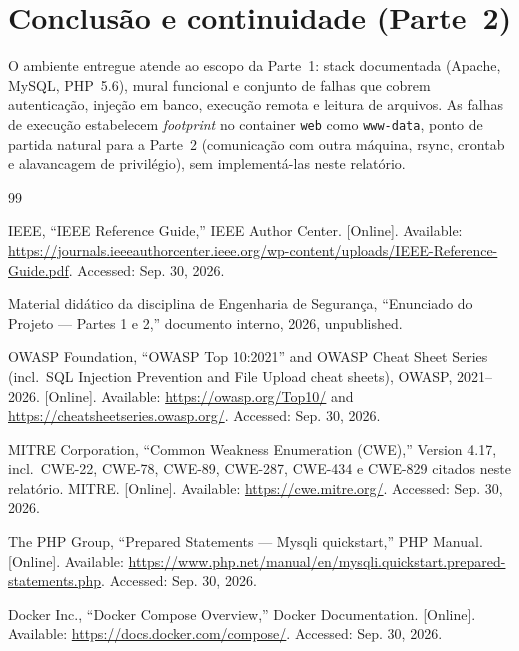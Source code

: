   \section{Conclusão e continuidade (Parte~2)}
  
  O ambiente entregue atende ao escopo da Parte~1: stack documentada (Apache, MySQL, PHP~5.6), mural
  funcional e conjunto de falhas que cobrem autenticação, injeção em banco, execução remota e leitura
  de arquivos. As falhas de execução estabelecem \emph{footprint} no container \texttt{web} como
  \texttt{www-data}, ponto de partida natural para a Parte~2 (comunicação com outra máquina, rsync,
  crontab e alavancagem de privilégio), sem implementá-las neste relatório.
  
  
  
  \begin{thebibliography}{99}
  
  IEEE, ``IEEE Reference Guide,'' IEEE Author Center. [Online]. Available:
  \url{https://journals.ieeeauthorcenter.ieee.org/wp-content/uploads/IEEE-Reference-Guide.pdf}.
  Accessed: Sep. 30, 2026.
  
  Material didático da disciplina de Engenharia de Segurança, ``Enunciado do Projeto --- Partes 1 e
  2,'' documento interno, 2026, unpublished.
  
  
  OWASP Foundation, ``OWASP Top 10:2021'' and OWASP Cheat Sheet Series (incl.\ SQL Injection
  Prevention and File Upload cheat sheets), OWASP, 2021--2026. [Online]. Available:
  \url{https://owasp.org/Top10/} and \url{https://cheatsheetseries.owasp.org/}. Accessed: Sep. 30,
  2026.
  
  MITRE Corporation, ``Common Weakness Enumeration (CWE),'' Version 4.17, incl.\ CWE-22, CWE-78,
  CWE-89, CWE-287, CWE-434 e CWE-829 citados neste relatório. MITRE. [Online]. Available:
  \url{https://cwe.mitre.org/}. Accessed: Sep. 30, 2026.
  
  
  The PHP Group, ``Prepared Statements --- Mysqli quickstart,'' PHP Manual. [Online]. Available:
  \url{https://www.php.net/manual/en/mysqli.quickstart.prepared-statements.php}. Accessed: Sep. 30,
  2026.
  
  Docker Inc., ``Docker Compose Overview,'' Docker Documentation. [Online]. Available:
  \url{https://docs.docker.com/compose/}. Accessed: Sep. 30, 2026.
  
  \end{thebibliography}